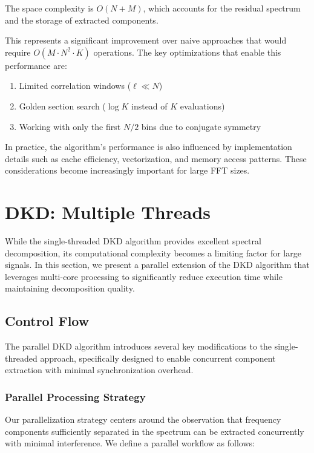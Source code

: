 \documentclass[11pt,twoside]{report}
\numberwithin{thm}{section}
\numberwithin{equation}{section}
\begin{document}
The space complexity is $O(N + M)$, which accounts for the residual spectrum and the storage of extracted components.

This represents a significant improvement over naive approaches that would require $O(M \cdot N^2 \cdot K)$ operations. The key optimizations that enable this performance are:
\begin{enumerate}
    \item Limited correlation windows ($\ell \ll N$)
    \item Golden section search ($\log K$ instead of $K$ evaluations)
    \item Working with only the first $N/2$ bins due to conjugate symmetry
\end{enumerate}

In practice, the algorithm's performance is also influenced by implementation details such as cache efficiency, vectorization, and memory access patterns. These considerations become increasingly important for large FFT sizes. 

\section{DKD: Multiple Threads}

While the single-threaded DKD algorithm provides excellent spectral decomposition, its computational complexity becomes a limiting factor for large signals. In this section, we present a parallel extension of the DKD algorithm that leverages multi-core processing to significantly reduce execution time while maintaining decomposition quality.

\subsection{Control Flow}

The parallel DKD algorithm introduces several key modifications to the single-threaded approach, specifically designed to enable concurrent component extraction with minimal synchronization overhead.

\subsubsection{Parallel Processing Strategy}

Our parallelization strategy centers around the observation that frequency components sufficiently separated in the spectrum can be extracted concurrently with minimal interference. We define a parallel workflow as follows:
\end{document}
